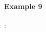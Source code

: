 \documentclass[11pt,a4paper,twoside,openright]{report}
\begin{document}
%
%	
%	
%
%
%
%
%
%
%
%
%
%	
%
%
%
%
%
%
%

\paragraph{Example 9}:
\end{document}
